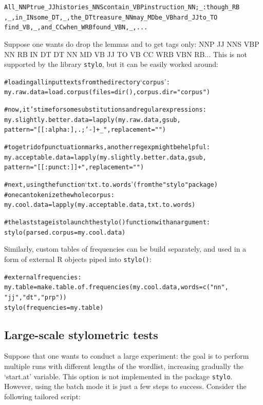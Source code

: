 \documentclass[11pt,a4paper]{article}
\def\code#1{{\tt #1}}
\begin{document}
\begin{alltt}
    All_NNP true_JJ histories_NNS contain_VBP instruction_NN ;_: though_RB 
    ,_, in_IN some_DT ,_, the_DT treasure_NN may_MD be_VB hard_JJ to_TO 
    find_VB ,_, and_CC when_WRB found_VBN ,_, ...
\end{alltt}

Suppose one wants do drop the lemmas and to get tags only: NNP JJ NNS VBP NN RB IN DT DT NN MD VB JJ TO VB CC WRB VBN RB... This is not supported by the library \code{stylo}, but it can be easily worked around:

\begin{alltt}
    # loading all input texts from the directory `corpus':
    my.raw.data = load.corpus(files = dir(), corpus.dir = "corpus")

    # now, it's time for some substitutions and regular expressions:
    my.slightly.better.data = lapply(my.raw.data, gsub, 
                         pattern = "[[:alpha:],.;'-]+_", replacement="")
    
    # to get rid of punctuation marks, another regexp might be helpful:
    my.acceptable.data = lapply(my.slightly.better.data, gsub,
                         pattern = "[[:punct:]]+", replacement = "")
    
    # next, using the function `txt.to.words' (from the "stylo" package)
    # one can tokenize the whole corpus:
    my.cool.data = lapply(my.acceptable.data, txt.to.words)

    # the last stage is to launch the stylo() function with an argument:
    stylo(parsed.corpus = my.cool.data)
\end{alltt}

Similarly, custom tables of frequencies can be build separately, and used in a form of external R objects piped into \code{stylo()}:

\begin{alltt}
   # external frequencies:
   my.table = make.table.of.frequencies(my.cool.data, words = c("nn",
                                                   "jj","dt","prp") )
   stylo(frequencies = my.table)
\end{alltt}




\subsection{Large-scale stylometric tests}


Suppose that one wants to conduct a large experiment: the goal is to perform multiple runs with different lengths of the wordlist, increasing gradually the `start.at' variable. This option is not implemented in the package \code{stylo}. However, using the batch mode it is just a few steps to success. Consider the following tailored script:
\end{document}
